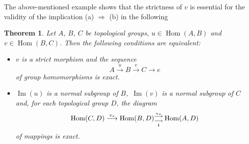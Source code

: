 \documentclass[12pt]{amsart}
\theoremstyle{theorem}
\newtheorem{theorem}{Theorem}[section]
\theoremstyle{definition}
\theoremstyle{remark} \theoremstyle{question} \theoremstyle{example}
\def\Hom{\operatorname{{Hom}}}
\def\mI{\operatorname{{Im}}}
\begin{document}
The above-mentioned example shows that the strictness of $v$ is essential
for the validity of the implication (a) $\Rightarrow$ (b) in the following

\begin{theorem}\label{Theorem3.4}
Let $A$, $B$, $C$ be topological groups, $u \in \Hom(A,B)$ and
$v \in \Hom(B,C)$. Then the following conditions are equivalent:

\begin{itemize}

\item[\rm (a)] $v$ is a strict morphism and the sequence
  $$
  A \overset{u}{\longrightarrow} B \overset{v}{\longrightarrow} C \longrightarrow e
  $$
  of group homomorphisms is exact.

\item[\rm (b)] $\mI(u)$ is a normal subgroup of $B$,\, $\mI(v)$ is a normal
  subgroup of $C$ and, for each topological group $D$, the diagram
  $$
  \Hom(C,D)\overset{v_*}{\longrightarrow}\Hom(B,D)^{\overset{u_*}{\longrightarrow}}_{\underset{\bf 1}{\longrightarrow}} \Hom(A,D)
  $$
  of mappings is exact.

\end{itemize}
\end{theorem}
\end{document}
